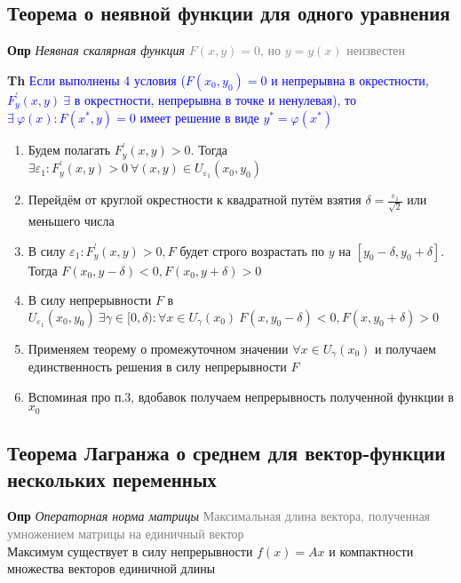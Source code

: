 \subsection{Теорема о неявной функции для одного уравнения}

\textbf{Опр} \textit{Неявная скалярная функция}
\textcolor{gray}{$F(x, y) = 0$, но $y = y(x)$ неизвестен}

\textbf{Th} \textcolor{blue}{Если выполнены 4 условия ($F (x_0, y_0) = 0$ и непрерывна в окрестности, $F^{'}_y (x, y)
~\exists$ в окрестности, непрерывна в точке и ненулевая), то $\exists~\varphi(x): F(x^*, y) = 0$ имеет решение в виде $y^* = \varphi (x^*)$}

\begin{enumerate}
    \item Будем полагать $F^{'}_y (x, y) > 0$.
    Тогда $\exists \varepsilon_1: F^{'}_y (x, y) > 0~\forall (x, y) \in U_{\varepsilon_1}(x_0, y_0)$
    \item Перейдём от круглой окрестности к квадратной путём взятия $\delta = \frac{\varepsilon_1}{\sqrt{2}}$ или
    меньшего числа
    \item В силу $\varepsilon_1: F^{'}_y (x, y) > 0, F$ будет строго возрастать по $y$ на $[y_0 - \delta, y_0 + \delta]$.
    Тогда $F(x_0, y - \delta) < 0, F(x_0, y + \delta) > 0$
    \item В силу непрерывности $F$ в $U_{\varepsilon_1}(x_0, y_0)~\exists \gamma \in [0, \delta): \forall x \in U_{\gamma}(x_0)~F(x, y_0 - \delta) < 0, F(x, y_0 + \delta) > 0$
    \item Применяем теорему о промежуточном значении $\forall x \in U_{\gamma}(x_0)$ и получаем единственность
    решения в силу непрерывности $F$
    \item Вспоминая про п.3, вдобавок получаем непрерывность полученной функции в $x_0$
\end{enumerate}

\subsection{Теорема Лагранжа о среднем для вектор-функции нескольких переменных}

\textbf{Опр} \textit{Операторная норма матрицы}
\textcolor{gray}{Максимальная длина вектора, полученная умножением матрицы на единичный вектор} \\

Максимум существует в силу непрерывности $f(x) = Ax$ и компактности множества векторов единичной длины

